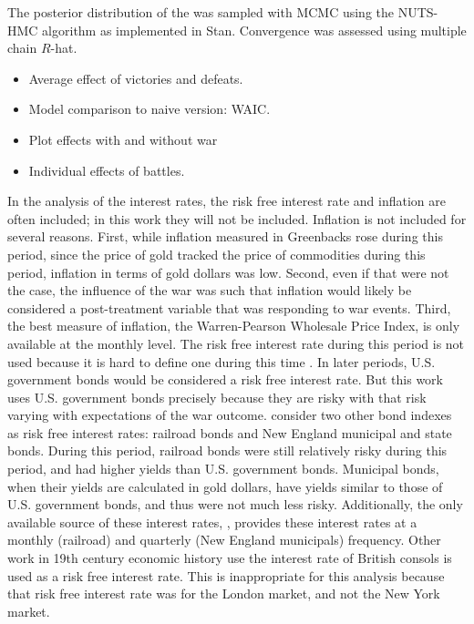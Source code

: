 The posterior distribution of the was sampled with MCMC using the NUTS-HMC algorithm as implemented in Stan.
Convergence was assessed using multiple chain $R$-hat.

\begin{itemize}
\item Average effect of victories and defeats.
\item Model comparison to naive version: WAIC.
\item Plot effects with and without war
\item Individual effects of battles.
\end{itemize}


In the analysis of the interest rates, the risk free interest rate and inflation are often included; in this work they will not be included.
Inflation is not included for several reasons.
First, while inflation measured in Greenbacks rose during this period, since the price of gold tracked the price of commodities during this period, inflation in terms of gold dollars was low\parencites{Mitchell1903}{Mitchell1908}.
Second, even if that were not the case, the influence of the war was such that inflation would likely be considered a post-treatment variable that was responding to war events.
Third, the best measure of inflation, the Warren-Pearson Wholesale Price Index, is only available at the monthly level.
The risk free interest rate during this period is not used because it is hard to define one during this time \parencites{HomerSylla2005}.
In later periods, U.S. government bonds would be considered a risk free interest rate.
But this work uses U.S. government bonds precisely because they are risky with that risk varying with expectations of the war outcome.
\textcites{Macaulay1938}{HomerSylla2005} consider two other bond indexes as risk free interest rates: railroad bonds and New England municipal and state bonds.
During this period, railroad bonds were still relatively risky during this period, and had higher yields than U.S. government bonds.
Municipal bonds, when their yields are calculated in gold dollars, have yields similar to those of U.S. government bonds, and thus were not much less risky.
Additionally, the only available source of these interest rates, \textcite{Macaulay1938}, provides these interest rates at a monthly (railroad) and quarterly (New England municipals) frequency.
Other work in 19th century economic history use the interest rate of British consols is used as a risk free interest rate.
This is inappropriate for this analysis because that risk free interest rate was for the London market, and not the New York market.

